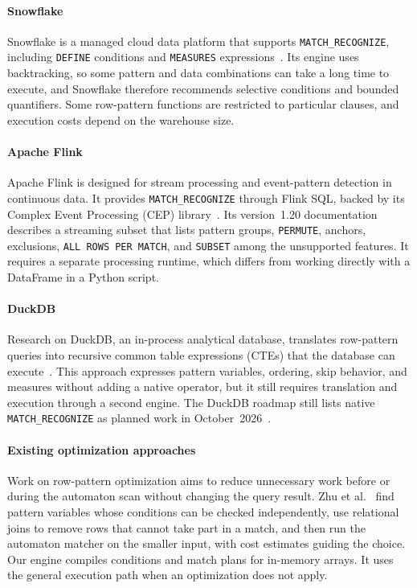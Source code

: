 \documentclass[preprint,12pt,times,a4paper]{elsarticle}
\begin{document}
\paragraph{Snowflake}
Snowflake is a managed cloud data platform that supports
\texttt{MATCH\_RECOGNIZE}, including \texttt{DEFINE} conditions and
\texttt{MEASURES} expressions~\cite{snowflake2025match_recognize}. Its engine
uses backtracking, so some pattern and data combinations can take a long time to
execute, and Snowflake therefore recommends selective conditions and bounded
quantifiers. Some row-pattern functions are restricted to particular clauses,
and execution costs depend on the warehouse size.

\paragraph{Apache Flink}
Apache Flink is designed for stream processing and event-pattern detection in
continuous data. It provides \texttt{MATCH\_RECOGNIZE} through Flink SQL,
backed by its Complex Event Processing (CEP) library~\cite{flink}. Its
version~1.20 documentation describes a streaming subset that lists pattern
groups, \texttt{PERMUTE}, anchors,
exclusions, \texttt{ALL ROWS PER MATCH}, and \texttt{SUBSET} among the
unsupported features. It requires a separate processing runtime, which differs
from working directly with a DataFrame in a Python script.

\paragraph{DuckDB}
Research on DuckDB, an in-process analytical database, translates row-pattern
queries into recursive common table expressions (CTEs) that the database can
execute~\cite{lambrecht2025democratize,findling2025bringing}. This approach
expresses pattern variables, ordering, skip behavior, and measures without
adding a native operator, but it still requires translation and execution
through a second engine.
The DuckDB roadmap still lists native \texttt{MATCH\_RECOGNIZE} as planned
work in October~2026~\cite{duckdb2026roadmap}.

\paragraph{Existing optimization approaches}
Work on row-pattern optimization aims to reduce unnecessary work before or
during the automaton scan without changing the query result. Zhu et
al.~\cite{10.14778/3579075.3579090} find pattern variables whose conditions can
be checked independently, use relational joins to remove rows that cannot take
part in a match, and then run the automaton matcher on the smaller input, with
cost estimates guiding the choice. Our engine compiles conditions and match
plans for in-memory arrays. It uses the general execution path when an
optimization does not apply.
\end{document}
